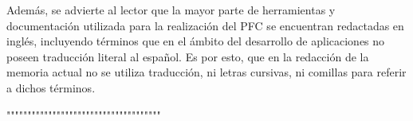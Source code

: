 Además, se advierte al lector que la mayor parte de herramientas y documentación utilizada para la realización del PFC se encuentran redactadas en inglés, incluyendo términos que en el ámbito del desarrollo de aplicaciones no poseen traducción literal al español. Es por esto, que en la redacción de la memoria actual no se utiliza traducción, ni letras cursivas, ni comillas para referir a dichos términos.

"""""""""""""""""""""""""""""""""""""


\endinput
